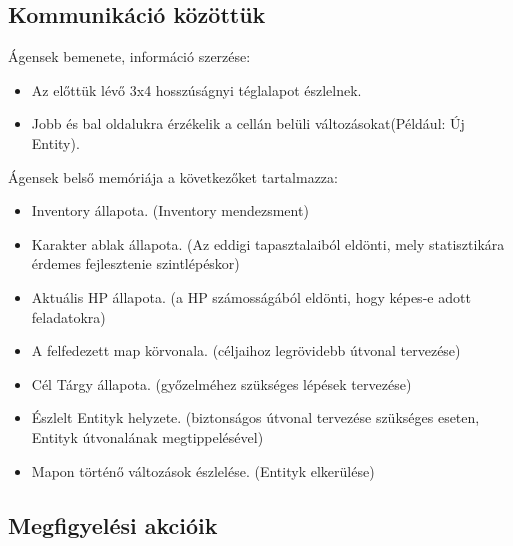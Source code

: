 \subsection{Kommunikáció közöttük}

Ágensek bemenete, információ szerzése:
\begin{itemize}
    \item Az előttük lévő 3x4 hosszúságnyi téglalapot észlelnek.
    \item Jobb és bal oldalukra érzékelik a cellán belüli változásokat(Például: Új Entity).
\end{itemize}

\noindent Ágensek belső memóriája a következőket tartalmazza:
\begin{itemize}
    \item Inventory állapota. (Inventory mendezsment)
    \item Karakter ablak állapota. (Az eddigi tapasztalaiból eldönti, mely statisztikára érdemes fejlesztenie szintlépéskor)
    \item Aktuális HP állapota. (a HP számosságából eldönti, hogy képes-e adott feladatokra)
    \item A felfedezett map körvonala. (céljaihoz legrövidebb útvonal tervezése)
    \item Cél Tárgy állapota. (győzelméhez szükséges lépések tervezése)
    \item Észlelt Entityk helyzete. (biztonságos útvonal tervezése szükséges eseten, Entityk útvonalának megtippelésével)
    \item Mapon történő változások észlelése. (Entityk elkerülése)
\end{itemize}

\subsection{Megfigyelési akcióik}

